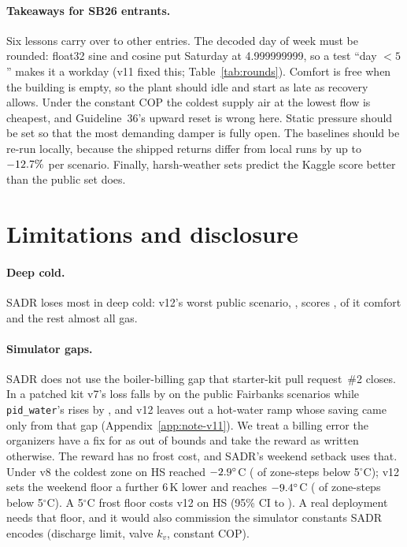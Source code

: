 \documentclass{article}
\begin{document}
\paragraph{Takeaways for SB26 entrants.} Six lessons carry over to other entries. The decoded day of week must be rounded: float32 sine and cosine put Saturday at 4.999999999, so a test ``day $<5$'' makes it a workday (v11 fixed this; Table~\ref{tab:rounds}). Comfort is free when the building is empty, so the plant should idle and start as late as recovery allows. Under the constant COP the coldest supply air at the lowest flow is cheapest, and Guideline~36's upward reset is wrong here. Static pressure should be set so that the most demanding damper is fully open. The baselines should be re-run locally, because the shipped returns differ from local runs by up to $-12.7\%$ per scenario. Finally, harsh-weather sets predict the Kaggle score better than the public set does.

\section{Limitations and disclosure}
\label{sec:limits}
\paragraph{Deep cold.} SADR loses most in deep cold: v12's worst public scenario, \RElvWorstPubScen, scores \RElvWorstPub, \RElvWorstPubComfortShare{} of it comfort and the rest almost all gas.

\paragraph{Simulator gaps.} SADR does not use the boiler-billing gap that starter-kit pull request~\#2 closes. In a patched kit v7's loss falls by \RFivePrTwoVSevenRelAbs{} on the \RFivePrTwoVSevenN{} public Fairbanks scenarios while \texttt{pid\_water}'s rises by \RFivePrTwoPidRelAbs, and v12 leaves out a hot-water ramp whose saving came only from that gap (Appendix~\ref{app:note-v11}). We treat a billing error the organizers have a fix for as out of bounds and take the reward as written otherwise. The reward has no frost cost, and SADR's weekend setback uses that. Under v8 the coldest zone on HS reached $-2.9^\circ$C (\RSixDecBelowFive{} of zone-steps below 5$^\circ$C); v12 sets the weekend floor a further 6\,K lower and reaches $-9.4^\circ$C (\RElvBelowFiveHS{} of zone-steps below 5$^\circ$C). A 5$^\circ$C frost floor costs v12 \RElvFrostHsRel{} on HS (95\% CI \RElvFrostHsLo{} to \RElvFrostHsHi). A real deployment needs that floor, and it would also commission the simulator constants SADR encodes (discharge limit, valve $k_v$, constant COP).
\end{document}
